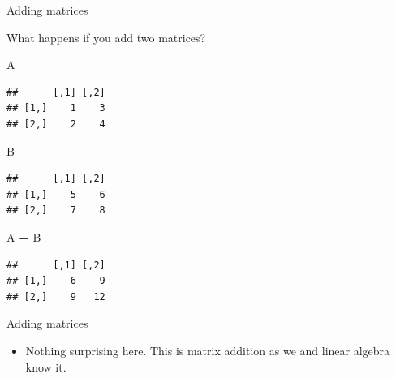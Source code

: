 \documentclass[
  ignorenonframetext,
]{beamer}
\newenvironment{Shaded}{\begin{snugshade}}{\end{snugshade}}
\newcommand{\NormalTok}[1]{#1}
\newcommand{\OperatorTok}[1]{\textcolor[rgb]{0.81,0.36,0.00}{\textbf{#1}}}
\newcommand{\StringTok}[1]{\textcolor[rgb]{0.31,0.60,0.02}{#1}}
\providecommand{\tightlist}{%
  \setlength{\itemsep}{0pt}\setlength{\parskip}{0pt}}
\begin{document}
\begin{frame}[fragile]{Adding matrices}
\protect\hypertarget{adding-matrices}{}

What happens if you add two matrices?

\begin{Shaded}
\begin{Highlighting}[]
\NormalTok{A}
\end{Highlighting}
\end{Shaded}

\begin{verbatim}
##      [,1] [,2]
## [1,]    1    3
## [2,]    2    4
\end{verbatim}

\begin{Shaded}
\begin{Highlighting}[]
\NormalTok{B}
\end{Highlighting}
\end{Shaded}

\begin{verbatim}
##      [,1] [,2]
## [1,]    5    6
## [2,]    7    8
\end{verbatim}

\begin{Shaded}
\begin{Highlighting}[]
\NormalTok{A }\OperatorTok{+}\StringTok{ }\NormalTok{B}
\end{Highlighting}
\end{Shaded}

\begin{verbatim}
##      [,1] [,2]
## [1,]    6    9
## [2,]    9   12
\end{verbatim}

\end{frame}

\begin{frame}{Adding matrices}
\protect\hypertarget{adding-matrices-1}{}

\begin{itemize}
\tightlist
\item
  Nothing surprising here. This is matrix addition as we and linear
  algebra know it.
\end{itemize}

\end{frame}
\end{document}
